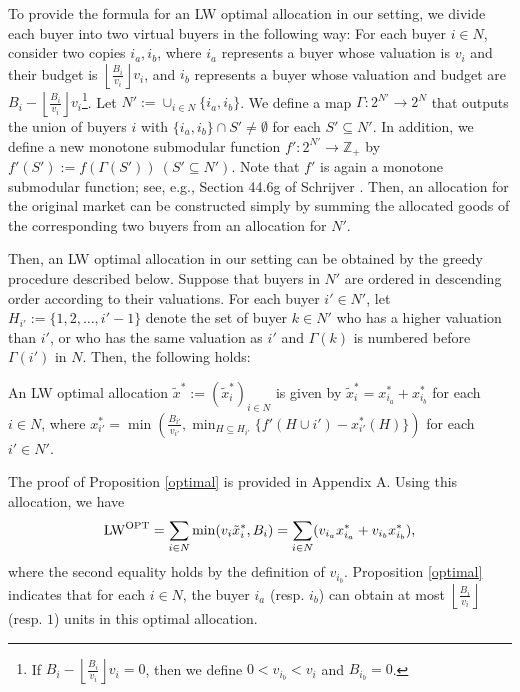\documentclass[letterpaper,11pt]{article}
\begin{document}
	To provide the formula for an LW optimal allocation in our setting, 
	we divide each buyer into two virtual buyers in the following way: 
	For each buyer $i\in N$, consider two copies $i_a, i_b$, 
	where $i_{a}$ represents a buyer whose valuation is $v_i$ and their budget is $\left\lfloor \frac{B_i}{v_i}\right\rfloor v_i$,
	and $i_{b}$ represents a buyer whose valuation and budget are $B_i-\left\lfloor \frac{B_i}{v_i}\right\rfloor v_i$\footnote{If $B_i-\left\lfloor \frac{B_i}{v_i}\right\rfloor v_i=0$, then we define 
	$0<v_{i_b}<v_i$ and $B_{i_b}=0$.}. 
	Let $N':= \cup_{i\in N}\{i_a, i_b\}$.
	We define a map $\Gamma:2^{N'}\to 2^N$ that outputs 
	the union of buyers $i$ with $\{i_a, i_b\}\cap S'\neq\emptyset$ for each $S'\subseteq N'$. 
	In addition, we define a new monotone submodular function $f': 2^{N'}\to \mathbb Z_{+}$ by 
	$f'(S'):=f(\Gamma(S'))\ (S'\subseteq N')$.  
	Note that $f'$ is again a monotone submodular function; see, e.g., Section 44.6g of Schrijver \cite{S2003}.
	Then, an allocation for the original market can be constructed 
	simply by summing the allocated goods of the corresponding two buyers from an allocation for $N'$.
	
	Then, an LW optimal allocation in our setting can be obtained by the greedy procedure described below.	
	Suppose that buyers in $N'$ are ordered in descending order according to their valuations.
	For each buyer $i'\in N'$, let $H_{i'}:=\{1,2,\ldots,i'-1\}$ denote the set of buyer $k\in N'$ 
	who has a higher valuation than $i'$, or who has the same valuation 
	as $i'$ and $\Gamma (k)$ is numbered before $\Gamma(i')$ in $N$. 
	Then, the following holds:
	\begin{proposition}
	\label{optimal}
	An LW optimal allocation $\tilde{x}^*:=(\tilde{x}^*_i)_{i\in N}$ is given by 
	$\tilde{x}^*_i=x^*_{i_{a}}+x^*_{i_{b}}$ for each $i\in N$, where 
	$x^{*}_{i'}=\min(\frac{B_{i'}}{v_{i'}},{\min_{H\subseteq H_{{i'}}}\{f'(H\cup i')-x^*_{i'}(H)}\})$ 
	for each $i'\in N'$.
	\end{proposition}
	The proof of Proposition \ref{optimal} is provided in Appendix A.
	Using this allocation, we have 
	\begin{equation}
	\label{LW_OPT}
	{\rm LW}^{\rm OPT}=\sum_{i\in N}\min(v_i \tilde{x}^{*}_i, B_i)=\sum_{i\in N} (v_{i_a} x^*_{i_a}+v_{i_b} x^*_{i_b}),
	\end{equation}
	where the second equality holds by the definition of $v_{i_b}$.
	Proposition \ref{optimal} indicates that for each $i\in N$, 
	the buyer $i_{a}$ (resp. $i_{b}$) can obtain at most 
	$\left\lfloor \frac{B_i}{v_i}\right\rfloor$ (resp. $1$) units in this optimal allocation.
	
\end{document}
